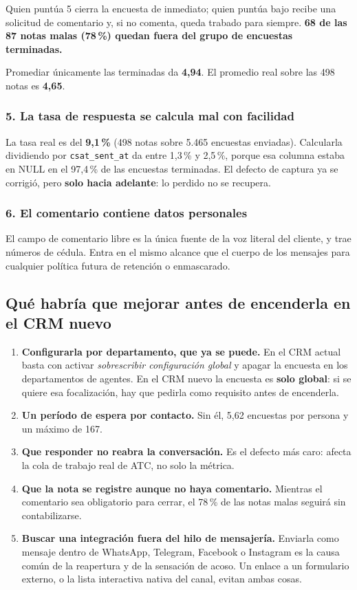 \documentclass[11pt,a4paper]{article}
\newcommand{\cod}[1]{\texttt{\small #1}}
\begin{document}
Quien puntúa 5 cierra la encuesta de inmediato; quien puntúa bajo recibe una solicitud de
comentario y, si no comenta, queda trabado para siempre. \textbf{68 de las 87 notas malas
(78\,\%) quedan fuera del grupo de encuestas terminadas.}

Promediar únicamente las terminadas da \textbf{4,94}. El promedio real sobre las 498
notas es \textbf{4,65}.

\subsubsection*{5. La tasa de respuesta se calcula mal con facilidad}

La tasa real es del \textbf{9,1\,\%} (498 notas sobre 5.465 encuestas enviadas).
Calcularla dividiendo por \cod{csat\_sent\_at} da entre 1,3\,\% y 2,5\,\%, porque esa
columna estaba en NULL en el 97,4\,\% de las encuestas terminadas. El defecto de captura
ya se corrigió, pero \textbf{solo hacia adelante}: lo perdido no se recupera.

\subsubsection*{6. El comentario contiene datos personales}

El campo de comentario libre es la única fuente de la voz literal del cliente, y trae
números de cédula. Entra en el mismo alcance que el cuerpo de los mensajes para cualquier
política futura de retención o enmascarado.

\subsection{Qué habría que mejorar antes de encenderla en el CRM nuevo}

\begin{enumerate}
  \item \textbf{Configurarla por departamento, que ya se puede.} En el CRM actual basta
        con activar \emph{sobrescribir configuración global} y apagar la encuesta en los
        departamentos de agentes. En el CRM nuevo la encuesta es \textbf{solo global}: si
        se quiere esa focalización, hay que pedirla como requisito antes de encenderla.
  \item \textbf{Un período de espera por contacto.} Sin él, 5,62 encuestas por persona y
        un máximo de 167.
  \item \textbf{Que responder no reabra la conversación.} Es el defecto más caro: afecta
        la cola de trabajo real de ATC, no solo la métrica.
  \item \textbf{Que la nota se registre aunque no haya comentario.} Mientras el
        comentario sea obligatorio para cerrar, el 78\,\% de las notas malas seguirá sin
        contabilizarse.
  \item \textbf{Buscar una integración fuera del hilo de mensajería.} Enviarla como
        mensaje dentro de WhatsApp, Telegram, Facebook o Instagram es la causa común de
        la reapertura y de la sensación de acoso. Un enlace a un formulario externo, o la
        lista interactiva nativa del canal, evitan ambas cosas.
\end{enumerate}
\end{document}
